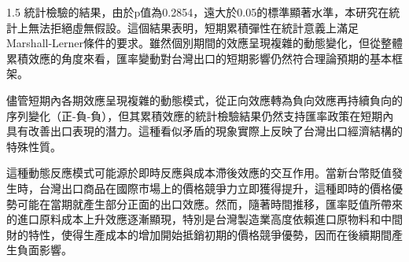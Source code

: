 \documentclass[a4paper,12pt]{article}
\begin{document}
\begin{spacing}{1.5}
統計檢驗的結果，由於p值為0.2854，遠大於0.05的標準顯著水準，本研究在統計上無法拒絕虛無假設。這個結果表明，短期累積彈性在統計意義上滿足Marshall-Lerner條件的要求。雖然個別期間的效應呈現複雜的動態變化，但從整體累積效應的角度來看，匯率變動對台灣出口的短期影響仍然符合理論預期的基本框架。

儘管短期內各期效應呈現複雜的動態模式，從正向效應轉為負向效應再持續負向的序列變化（正-負-負），但其累積效應的統計檢驗結果仍然支持匯率政策在短期內具有改善出口表現的潛力。這種看似矛盾的現象實際上反映了台灣出口經濟結構的特殊性質。

這種動態反應模式可能源於即時反應與成本滯後效應的交互作用。當新台幣貶值發生時，台灣出口商品在國際市場上的價格競爭力立即獲得提升，這種即時的價格優勢可能在當期就產生部分正面的出口效應。然而，隨著時間推移，匯率貶值所帶來的進口原料成本上升效應逐漸顯現，特別是台灣製造業高度依賴進口原物料和中間財的特性，使得生產成本的增加開始抵銷初期的價格競爭優勢，因而在後續期間產生負面影響。

\end{spacing}
\end{document}
